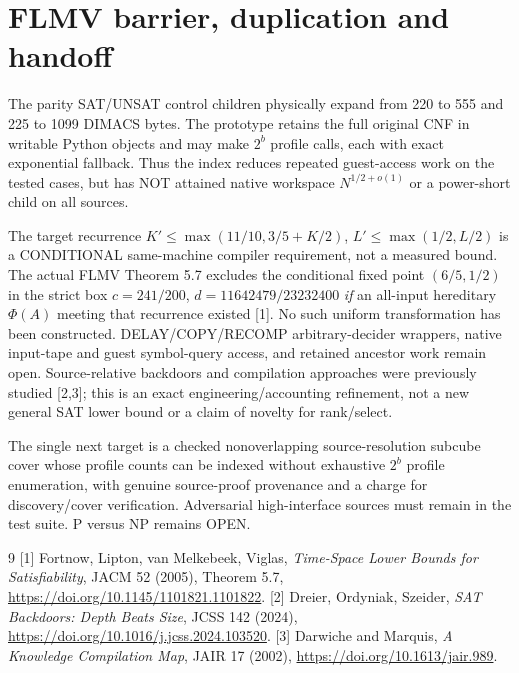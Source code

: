 \documentclass[11pt]{article}
\begin{document}
\section{FLMV barrier, duplication and handoff}
The parity SAT/UNSAT control children physically expand
from 220 to 555 and 225 to 1099 DIMACS bytes. The prototype
retains the full original CNF in writable Python objects and
may make $2^b$ profile calls, each with exact exponential
fallback. Thus the index reduces repeated guest-access work
on the tested cases, but has NOT attained native workspace
$N^{1/2+o(1)}$ or a power-short child on all sources.

The target recurrence
$K'\le\max(11/10,3/5+K/2)$,
$L'\le\max(1/2,L/2)$ is a CONDITIONAL
same-machine compiler requirement, not a measured bound.
The actual FLMV Theorem 5.7 excludes the conditional fixed
point $(6/5,1/2)$ in the strict box
$c=241/200$, $d=11642479/23232400$ \emph{if} an all-input
hereditary $\Phi(A)$ meeting that recurrence existed [1].
No such uniform transformation has been constructed.
DELAY/COPY/RECOMP arbitrary-decider wrappers, native input-tape
and guest symbol-query access, and retained ancestor work remain open.
Source-relative backdoors and compilation approaches were previously
studied [2,3]; this is an exact engineering/accounting refinement,
not a new general SAT lower bound or a claim of novelty for rank/select.

The single next target is a checked nonoverlapping source-resolution
subcube cover whose profile counts can be indexed without exhaustive
$2^b$ profile enumeration, with genuine source-proof provenance
and a charge for discovery/cover verification. Adversarial
high-interface sources must remain in the test suite.
P versus NP remains OPEN.

\begin{thebibliography}{9}
 [1] Fortnow, Lipton, van Melkebeek, Viglas,
\emph{Time-Space Lower Bounds for Satisfiability}, JACM 52 (2005),
Theorem 5.7, \url{https://doi.org/10.1145/1101821.1101822}.
 [2] Dreier, Ordyniak, Szeider,
\emph{SAT Backdoors: Depth Beats Size}, JCSS 142 (2024),
\url{https://doi.org/10.1016/j.jcss.2024.103520}.
 [3] Darwiche and Marquis,
\emph{A Knowledge Compilation Map}, JAIR 17 (2002),
\url{https://doi.org/10.1613/jair.989}.
\end{thebibliography}
\end{document}
